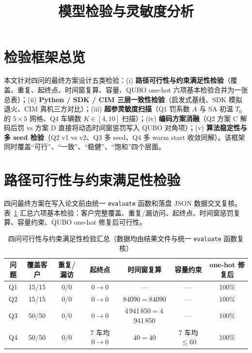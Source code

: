 \documentclass[UTF8,12pt,a4paper]{ctexart}
\title{模型检验与灵敏度分析}
\author{}
\date{}
\begin{document}
\maketitle

\section{检验框架总览}

本文针对四问的最终方案设计五类检验：(i) \textbf{路径可行性与约束满足性检验}（覆盖、重复、起终点、时间窗复算、容量、QUBO one-hot 六项基本检验合并为一张总表）；(ii) \textbf{Python / SDK / CIM 三层一致性检验}（启发式基线、SDK 模拟退火、CIM 真机三方对比）；(iii) \textbf{超参灵敏度扫描}（Q1 罚系数 $A$ 与 SA 初温 $T_0$ 的 $5\!\times\!5$ 网格、Q4 车辆数 $K\!\in\![4,10]$ 扫描）；(iv) \textbf{编码方案消融}（Q2 方案 C 解码后罚 vs 方案 D 直接将动态时间窗惩罚写入 QUBO 对角项）；(v) \textbf{算法稳定性与多 seed 检验}（Q2 v1 vs v2、Q3 多 seed、Q4 多 warm start 收敛同解）。该框架同时覆盖``可行''、``一致''、``稳健''、``饱和''四个层面。

\section{路径可行性与约束满足性检验}
\label{sec:sens-feasibility}

四问最终方案在写入论文前由统一 \texttt{evaluate} 函数和落盘 JSON 数据交叉复核。表~\ref{tab:sens-feasibility} 汇总六项基本检验：客户完整覆盖、重复/漏访问、起终点、时间窗惩罚复算、容量约束、QUBO one-hot 修复后可行性。

\begin{table}[H]
    \centering
    \caption{四问可行性与约束满足性检验汇总（数据均由结果文件与统一 \texttt{evaluate} 函数复核）}
    \label{tab:sens-feasibility}
    \footnotesize
    \begin{tabular}{ccccccc}
        \toprule
        问题 & 覆盖客户 & 重复/漏访 & 起终点 & 时间窗复算 & 容量约束 & one-hot 修复后 \\
        \midrule
        Q1 & 15/15 & 0/0 & $0\!\to\!0$ & --- & --- & 100\% \\
        Q2 & 15/15 & 0/0 & $0\!\to\!0$ & 84090$=$84090 & --- & 100\% \\
        Q3 & 50/50 & 0/0 & $0\!\to\!0$ & 4\,941\,850$=$4\,941\,850 & --- & 100\% \\
        Q4 & 50/50 & 0/0 & 7 车均 $0\!\to\!0$ & $40=40$ & 7 车均 $\le 60$ & 100\% \\
        \bottomrule
    \end{tabular}
\end{table}
\end{document}
